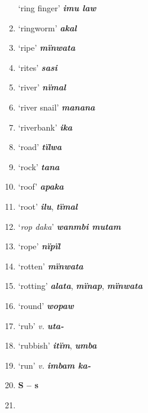 \begin{enumerate}[noitemsep, label={}, align=left, widest=190, labelsep=1ex,leftmargin=*,itemindent=-10pt]
‘ring finger’ \textbf{\textit{imu law}} \item
‘ringworm’ \textbf{\textit{akal}} \item
‘ripe’ \textbf{\textit{mïnwata}} \item
‘rites’ \textbf{\textit{sasi}} \item
‘river’ \textbf{\textit{nïmal}} \item
‘river snail’ \textbf{\textit{manana}} \item
‘riverbank’ \textbf{\textit{ika}} \item
‘road’ \textbf{\textit{tïlwa}} \item
‘rock’ \textbf{\textit{tana}} \item
‘roof’ \textbf{\textit{apaka}} \item
‘root’ \textbf{\textit{ilu}}, \textbf{\textit{tïmal}} \item
‘\textit{rop daka}’ \textbf{\textit{wanmbi mutam}} \item
‘rope’ \textbf{\textit{nïpïl}} \item
‘rotten’ \textbf{\textit{mïnwata}} \item
‘rotting’ \textbf{\textit{alata}}, \textbf{\textit{mïnap}}, \textbf{\textit{mïnwata}} \item
‘round’ \textbf{\textit{wopaw}} \item
‘rub’ \textit{v.} \textbf{\textit{uta-}} \item
‘rubbish’ \textbf{\textit{itïm}}, \textbf{\textit{umba}} \item
‘run’ \textit{v.} \textbf{\textit{imbam ka-}}\\ \item

\noindent \textbf{S – s}\\ \item


\end{enumerate}

